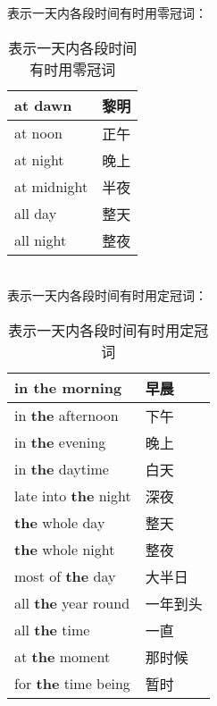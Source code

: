 \documentclass[UTF8]{ctexart}
\begin{document}
    表示一天内各段时间有时用零冠词：
    \begin{table}[h!]
        \begin{center}
            \ttfamily
            \begin{tabular}{p{180pt}|p{100pt}}
                \hline
                at dawn&黎明\\ \hline
                at noon&正午\\ \hline
                at night&晚上\\ \hline
                at midnight&半夜\\ \hline
                all day&整天\\ \hline
                all night&整夜\\ \hline
            \end{tabular}
            \rmfamily
            \caption{表示一天内各段时间有时用零冠词}
        \end{center}
    \end{table}\\
    表示一天内各段时间有时用定冠词：
    \begin{table}[h!]
        \begin{center}
            \ttfamily
            \begin{tabular}{p{180pt}|p{100pt}}
                \hline
                in \textbf{the} morning&早晨\\ \hline
                in \textbf{the} afternoon&下午\\ \hline
                in \textbf{the} evening&晚上\\ \hline
                in \textbf{the} daytime&白天\\ \hline
                late into \textbf{the} night&深夜\\ \hline
                \textbf{the} whole day&整天\\ \hline
                \textbf{the} whole night&整夜\\ \hline
                most of \textbf{the} day&大半日\\ \hline
                all \textbf{the} year round&一年到头\\ \hline
                all \textbf{the} time&一直\\ \hline
                at \textbf{the} moment&那时候\\ \hline
                for \textbf{the} time being&暂时\\ \hline
            \end{tabular}
            \rmfamily
            \caption{表示一天内各段时间有时用定冠词}
        \end{center}
    \end{table}
\end{document}
